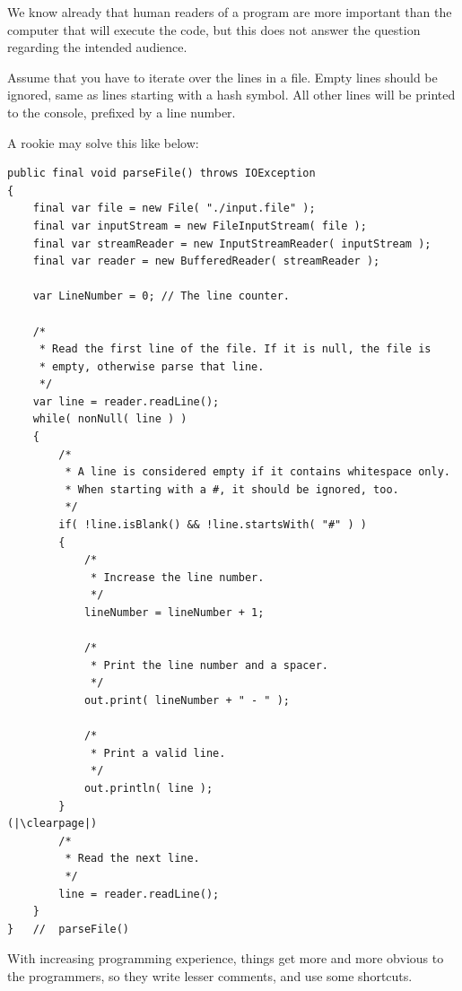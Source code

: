 We know already that human readers of a program are more important than the computer that will execute the code, but this does not answer the question regarding the intended audience.

Assume that you have to iterate over the lines in a file. Empty lines should be ignored, same as lines starting with a hash symbol. All other lines will be printed to the console, prefixed by a line number.

A rookie may solve this like below:
\begin{lstlisting}
public final void parseFile() throws IOException
{
    final var file = new File( "./input.file" );
    final var inputStream = new FileInputStream( file );
    final var streamReader = new InputStreamReader( inputStream );
    final var reader = new BufferedReader( streamReader );

    var LineNumber = 0; // The line counter.
    
    /*
     * Read the first line of the file. If it is null, the file is
     * empty, otherwise parse that line.
     */
    var line = reader.readLine();
    while( nonNull( line ) )
    {
        /*
         * A line is considered empty if it contains whitespace only.
         * When starting with a #, it should be ignored, too.
         */
        if( !line.isBlank() && !line.startsWith( "#" ) )
        {
            /*
             * Increase the line number.
             */
            lineNumber = lineNumber + 1;
            
            /*
             * Print the line number and a spacer.
             */
            out.print( lineNumber + " - " );
            
            /*
             * Print a valid line.
             */
            out.println( line );
        }
(|\clearpage|)        
        /*
         * Read the next line.
         */
        line = reader.readLine();
    }
}   //  parseFile()  
\end{lstlisting}

With increasing programming experience, things get more and more obvious to the programmers, so they write lesser comments, and use some shortcuts.

